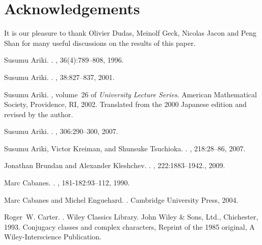 \documentclass[twoside,12pt]{amsart}
\theoremstyle{plain}
\begin{document}
\section*{Acknowledgements}

It is our pleasure to thank Olivier Dudas, Meinolf Geck, Nicolas Jacon
and Peng Shan for many useful discussions on the results of this paper.

\begin{thebibliography}{110}

Susumu Ariki.
.
, 36(4):789--808, 1996.

Susumu Ariki.
.
, 38:827--837, 2001.

Susumu Ariki.
, volume~26 of {\em University Lecture Series}.
\newblock American Mathematical Society, Providence, RI, 2002.
\newblock Translated from the 2000 Japanese edition and revised by the author.

Susumu Ariki.
.
, 306:290--300, 2007.

Susumu Ariki, Victor Kreiman, and Shunsuke Tsuchioka.
.
, 218:28--86, 2007.

Jonathan Brundan and Alexander Kleshchev.
.
, 222:1883--1942., 2009.

Marc Cabanes.
.
, 181-182:93--112, 1990.

Marc Cabanes and Michel Enguehard.
.
\newblock Cambridge University Press, 2004.

Roger~W. Carter.
.
\newblock Wiley Classics Library. John Wiley \& Sons, Ltd., Chichester, 1993.
\newblock Conjugacy classes and complex characters, Reprint of the 1985
  original, A Wiley-Interscience Publication.


\end{thebibliography}
\end{document}
